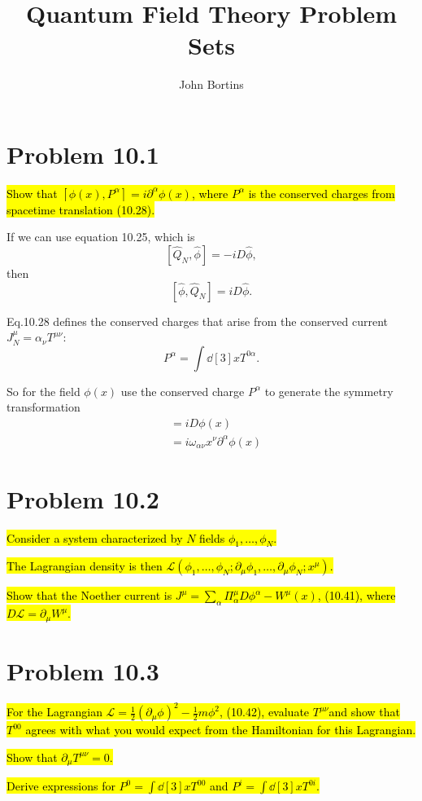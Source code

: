 \documentclass{article}
\title{Quantum Field Theory Problem Sets}
\author{John Bortins}
\begin{document}
\maketitle{}

\section*{Problem 10.1}
\begin{quoting}
    \hl{Show that $[\phi(x),P^\alpha]=i\partial^\alpha \phi(x)$, where $P^\alpha$ is the conserved charges from spacetime translation (10.28).}
\end{quoting}


If we can use equation 10.25, which is \[[\hat{Q}_{N},\hat{\phi}]=-iD\hat{\phi},\] then \[[\hat{\phi},\hat{Q}_{N}]=iD\hat{\phi}.\]

Eq.10.28 defines the conserved charges that arise from the conserved current $J_N^\mu=\alpha_\nu T^{\mu\nu}$: \[P^\alpha=\int \dd[3]{x}T^{0\alpha} .\]

So for the field $\phi(x)$ use the conserved charge $P^\alpha$ to generate the symmetry transformation
\begin{align*}
    [\phi(x),P^\alpha] & =iD\phi(x)                                         \\
                       & =i\omega_{\alpha\nu} x^\nu \partial^\alpha \phi(x)
\end{align*}



\section*{Problem 10.2}
\begin{quoting}
    \hl{Consider a system characterized by $N$ fields $\phi_1,\dots,\phi_N$.}
    
    \hl{The Lagrangian density is then $\mathcal{L}(\phi_1,\dots,\phi_N;\partial_\mu \phi_1,\dots,\partial_\mu \phi_N;x^\mu)$.}
    
    \hl{Show that the Noether current is $J^\mu=\sum_\alpha \Pi_\alpha^\mu  D\phi^\alpha-W^\mu(x)$, (10.41), where $D\mathcal{L}=\partial_\mu W^\mu$.}
\end{quoting}


\section*{Problem 10.3}
\begin{quoting}
    \hl{For the Lagrangian $\mathcal{L}=\frac{1}{2}(\partial_\mu \phi)^2-\frac{1}{2}m\phi^2$, (10.42), evaluate $T^{\mu\nu}$and show that $T^{00}$ agrees with what you would expect from the Hamiltonian for this Lagrangian.}
    
    \hl{Show that $\partial_\mu T^{\mu\nu}=0$.}
    
    \hl{Derive expressions for $P^0=\int\dd[3]{x}T^{00}$ and $P^i=\int\dd[3]{x}T^{0i}$.}
\end{quoting}
\end{document}
